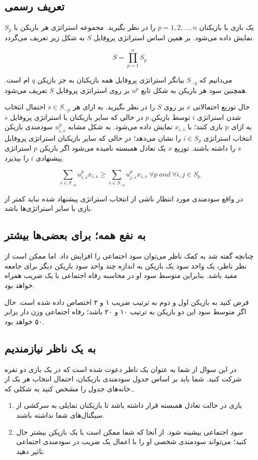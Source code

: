\subsection*{تعریف رسمی}
یک بازی با بازیکنان $p = 1,2,...,n$ را در نظر بگیرید. مجموعه استراتژی هر بازیکن با $S_p$ نمایش داده می‌شود. بر همین اساس استراتژی پروفایل $S$ به شکل زیر تعریف می‌گردد.

$$ S = \prod_{p=1}^{n} S_p $$

می‌دانیم که $S_{-q}$ بیانگر استراتژی پروفایل همه بازیکنان به جز بازیکن $q$ ام است. همچنین سود هر بازیکن به شکل تابع $u^p$ بر روی استراتژی پروفایل $S$ تعریف می‌شود.

حال توزیع احتمالاتی $x$ بر روی $S$ را در نظر بگیرید. به ازای هر $\overline{s} \in S_{-p}$ احتمال انتخاب شدن استراتژی $i$ توسط بازیکن $p$ در حالی که سایر بازیکنان با استراتژی پروفایل $\overline{s}$ بازی کنند؛ با $x_{i,\overline{s}}$ نمایش داده می‌شود. به شکل مشابه $u_{i,\overline{s}}^{p}$ سودمندی بازیکن p به ازای انتخاب استراتژی $i \in S_p$ را نشان می‌دهد؛ در حالی که سایر بازیکنان استراتژی پروفایل $\overline{s}$ را داشته باشند.
توزیع $x$ یک تعادل همبسته نامیده می‌شود اگر بازیکن $p$ استراتژی پیشنهادی $i$ را بپذیرد.

$$\sum_{\overline{s} \in S_{-p}}{u_{i,\overline{s}}^{p}x_{i, \overline{s}}} \geq \sum_{\overline{s} \in S_{-p}}{u_{j,\overline{s}}^{p}x_{i, \overline{s}}} \; \forall{p} \: and \: \forall{i,j} \in S_p$$

در واقع سودمندی مورد انتظار ناشی از انتخاب استراتژی پیشنهاد شده نباید کمتر از بازی با سایر استراتژی‌ها باشد.

\subsection*{به نفع همه؛ برای بعضی‌ها بیشتر}
چنانچه گفته شد به کمک ناظر می‌توان سود اجتماعی را افزایش داد. اما ممکن است از نظر ناظر، یک واحد سود یک بازیکن به اندازه چند واحد سود بازیکن دیگر برای جامعه مفید باشد. بنابراین متوسط سود او در محاسبه رفاه اجتماعی با یک ضریب همراه خواهد بود.

فرض کنید به بازیکن اول و دوم به ترتیب ضریب ۱ و ۲ اختصاص داده شده است. حال اگر متوسط سود این دو بازیکن به ترتیب ۱۰ و ۲۰ باشد؛ رفاه اجتماعی وزن دار برابر ۵۰ خواهد بود.

\subsection*{به یک ناظر نیازمندیم}
در این سوال از شما به عنوان یک ناظر دعوت شده است که در یک بازی دو نفره شرکت کنید. شما باید بر اساس جدول سودمندی بازیکنان، احتمال انتخاب هر یک از خانه‌های جدول را مشخص کنید به شکلی که…
\begin{enumerate}
\item
بازی در حالت تعادل همبسته قرار داشته باشد تا بازیکنان تمایلی به سرکشی از سیگنال‌های شما نداشته باشند.
\item
سود اجتماعی بیشینه شود. از آنجا که شما ممکن است با یک بازیکن بیشتر حال کنید؛ می‌تواند سودمندی شخصی او را با اعمال یک ضریب در سودمندی اجتماعی تاثیر دهید.
\end{enumerate}

